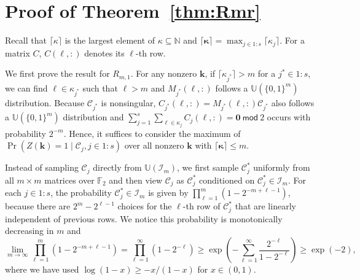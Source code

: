 \documentclass{article}
\theoremstyle{definition}
\renewcommand{\leq}{\leqslant}
\renewcommand{\geq}{\geqslant}
\newcommand{\tmod}{\ \mathsf{mod}\ }
\newcommand{\natu}{\mathbb{N}}
\newcommand{\bsk}{\boldsymbol{k}}
\newcommand{\bszero}{\boldsymbol{0}}
\newcommand{\bskappa}{\boldsymbol{\kappa}}
\newcommand{\dunif}{\mathbb{U}}
\begin{document}
\section{Proof of Theorem~\ref{thm:Rmr}}
Recall that $\lceil\kappa\rceil$ is the largest element of $\kappa\subseteq \natu$ and $\lceil\bskappa\rceil=\max_{j\in 1{:}s}\lceil\kappa_j\rceil$. For a matrix $C$, $C(\ell, :)$ denotes its $\ell$-th row.

    We first prove the result for $R_{m,1}$. For any nonzero $\bsk$, if $\lceil\kappa_{j^*}\rceil >m$ for a $j^*\in 1{:}s$, we can find $\ell\in \kappa_{j^*}$ such that $\ell>m$ and $M_{j^*}(\ell,:)$ follows a $\dunif(\{0,1\}^m)$ distribution. Because $\mathcal{C}_{j^*}$ is nonsingular, $C_{j^*}(\ell,:)=M_{j^*}(\ell,:)\mathcal{C}_{j^*}$ also follows a $\dunif(\{0,1\}^m)$ distribution and $\sum_{j=1}^s \sum_{\ell\in \kappa_j}  C_j(\ell,:)=\bszero \tmod 2$ occurs with probability $2^{-m}$. Hence, it suffices to consider the maximum of $\Pr(Z(\bsk)=1\mid \mathcal{C}_j, j\in 1{:}s)$ over all nonzero $\bsk$ with $\lceil\bskappa\rceil\leq m$.

Instead of sampling $\mathcal{C}_j$ directly  from $\dunif(\mathcal{I}_m)$, we first sample $\mathcal{C}^*_j$ uniformly from all $m\times m$ matrices over $\mathbb{F}_2$ and then view $\mathcal{C}_j$ as $\mathcal{C}^*_j$ conditioned on $\mathcal{C}^*_j\in \mathcal{I}_m$. For each $j\in 1{:}s$, the probability $\mathcal{C}^*_j\in\mathcal{I}_m$ is given by $\prod_{\ell=1}^m (1-2^{-m+\ell-1})$, because there are $2^m-2^{\ell-1}$ choices for the $\ell$-th row of $\mathcal{C}^*_j$ that are linearly independent of previous rows. We notice this probability is monotonically decreasing in $m$ and 
$$\lim_{m\to\infty}\prod_{\ell=1}^m (1-2^{-m+\ell-1})=\prod_{\ell=1}^\infty (1-2^{-\ell})\geq \exp(-\sum_{\ell=1}^\infty \frac{2^{-\ell}}{1-2^{-\ell}})\geq \exp(-2), $$
where we have used $\log(1-x)\geq - x/(1-x)$ for $x\in (0,1)$.
\end{document}
